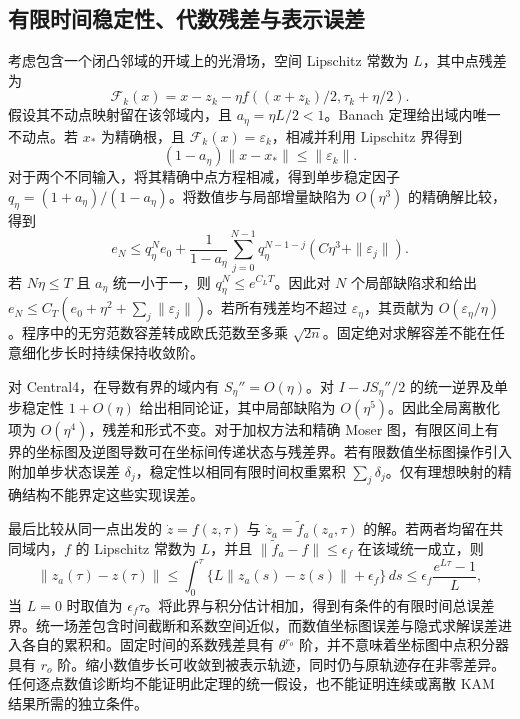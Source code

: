 \subsection{有限时间稳定性、代数残差与表示误差}
考虑包含一个闭凸邻域的开域上的光滑场，空间 Lipschitz 常数为 $L$，其中点残差为
\begin{equation}
 \mathcal F_k(x)=x-z_k-\eta f((x+z_k)/2,\tau_k+\eta/2).
 \label{eq:sup-midpoint-residual}
\end{equation}
假设其不动点映射留在该邻域内，且 $a_\eta=\eta L/2<1$。Banach 定理给出域内唯一不动点。若 $x_*$ 为精确根，且 $\mathcal F_k(x)=\varepsilon_k$，相减并利用 Lipschitz 界得到
\begin{equation}
 (1-a_\eta)\|x-x_*\|\le\|\varepsilon_k\|.
 \label{eq:sup-residual-to-state}
\end{equation}
对于两个不同输入，将其精确中点方程相减，得到单步稳定因子 $q_\eta=(1+a_\eta)/(1-a_\eta)$。将数值步与局部增量缺陷为 $O(\eta^3)$ 的精确解比较，得到
\begin{equation}
 e_N\le q_\eta^Ne_0+\frac{1}{1-a_\eta}
 \sum_{j=0}^{N-1}q_\eta^{N-1-j}(C\eta^3+\|\varepsilon_j\|).
 \label{eq:sup-error-sum}
\end{equation}
若 $N\eta\le T$ 且 $a_\eta$ 统一小于一，则 $q_\eta^N\le e^{C_LT}$。因此对 $N$ 个局部缺陷求和给出 $e_N\le C_T(e_0+\eta^2+\sum_j\|\varepsilon_j\|)$。若所有残差均不超过 $\varepsilon_\eta$，其贡献为 $O(\varepsilon_\eta/\eta)$。程序中的无穷范数容差转成欧氏范数至多乘 $\sqrt{2n}$。固定绝对求解容差不能在任意细化步长时持续保持收敛阶。

对 Central4，在导数有界的域内有 $S_\eta''=O(\eta)$。对 $I-JS_\eta''/2$ 的统一逆界及单步稳定性 $1+O(\eta)$ 给出相同论证，其中局部缺陷为 $O(\eta^5)$。因此全局离散化项为 $O(\eta^4)$，残差和形式不变。对于加权方法和精确 Moser 图，有限区间上有界的坐标图及逆图导数可在坐标间传递状态与残差界。若有限数值坐标图操作引入附加单步状态误差 $\delta_j$，稳定性以相同有限时间权重累积 $\sum_j\delta_j$。仅有理想映射的精确结构不能界定这些实现误差。

最后比较从同一点出发的 $\dot z=f(z,\tau)$ 与 $\dot z_a=\widetilde f_a(z_a,\tau)$ 的解。若两者均留在共同域内，$f$ 的 Lipschitz 常数为 $L$，并且 $\|\widetilde f_a-f\|\le\epsilon_f$ 在该域统一成立，则
\begin{equation}
 \|z_a(\tau)-z(\tau)\|
 \le\int_0^\tau\{L\|z_a(s)-z(s)\|+\epsilon_f\}\,ds
 \le\epsilon_f\frac{e^{L\tau}-1}{L},
 \label{eq:sup-gronwall}
\end{equation}
当 $L=0$ 时取值为 $\epsilon_f\tau$。将此界与积分估计相加，得到有条件的有限时间总误差界。统一场差包含时间截断和系数空间近似，而数值坐标图误差与隐式求解误差进入各自的累积和。固定时间的系数残差具有 $\theta^{r_o}$ 阶，并不意味着坐标图中点积分器具有 $r_o$ 阶。缩小数值步长可收敛到被表示轨迹，同时仍与原轨迹存在非零差异。任何逐点数值诊断均不能证明此定理的统一假设，也不能证明连续或离散 KAM 结果所需的独立条件。

